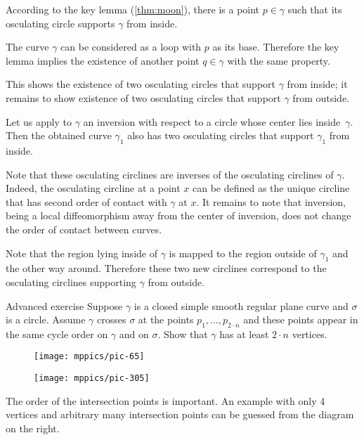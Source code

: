 \documentclass{article}
\begin{document}
According to the key lemma (\ref{thm:moon}), there is a point $p\in\gamma$ such that its osculating circle supports $\gamma$ from inside.

The curve $\gamma$ can be considered as a loop with $p$ as its base.
Therefore the key lemma implies the existence of another point $q\in\gamma$ with the same property.

This shows the existence of two osculating circles that support $\gamma$ from inside;
it remains to show existence of two osculating circles that support $\gamma$ from outside.

Let us apply to $\gamma$ an inversion with respect to a circle whose center lies inside~$\gamma$.
Then the obtained curve $\gamma_1$ also has  two osculating circles that support $\gamma_1$ from inside.

Note that these osculating circlines are inverses of the osculating circlines of $\gamma$.
Indeed, the osculating circline at a point $x$ can be defined as the unique circline that has second order of contact with $\gamma$ at $x$.
It remains to note that inversion, being a local diffeomorphism away from the center of inversion, does not change the order of contact between curves.

Note that the region lying inside of $\gamma$ is mapped to the region outside of $\gamma_1$ and the other way around.
Therefore these two new circlines correspond to the osculating circlines supporting $\gamma$ from outside.
\qeds

\begin{thm}{Advanced exercise}\label{ex:curve-crosses-circle}
Suppose $\gamma$ is a closed simple smooth regular plane curve and $\sigma$ is a circle.
Assume $\gamma$ crosses $\sigma$ at the points $p_1,\dots,p_{2{\cdot} n}$ and these points appear in the same cycle order on $\gamma$ and on $\sigma$.
Show that $\gamma$ has at least $2\cdot n$ vertices.
\end{thm}


\begin{figure}[!ht]
\begin{minipage}{.48\textwidth}
\centering
\texttt{[image: mppics/pic-65]}
\end{minipage}\hfill
\begin{minipage}{.48\textwidth}
\centering
\texttt{[image: mppics/pic-305]}
\end{minipage}
\end{figure}

The order of the intersection points is important. 
An example with only 4 vertices and arbitrary many intersection points can be guessed from the diagram on the right. 



\sloppy
\printbibliography[heading=bibintoc]
\fussy
\end{document}
